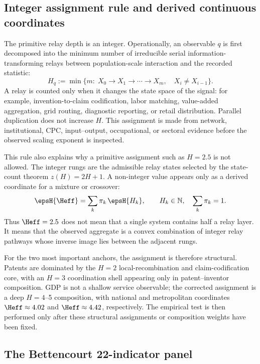 \subsection{Integer assignment rule and derived continuous coordinates}
\label{subsec:integer_assignment_rule}

The primitive relay depth is an integer. Operationally, an observable \(q\)
is first decomposed into the minimum number of irreducible serial
information-transforming relays between population-scale interaction and the
recorded statistic:
\[
H_q := \min\{m:\; X_0\rightarrow X_1\rightarrow\cdots\rightarrow X_m,
\quad X_i\neq X_{i-1}\}.
\]
A relay is counted only when it changes the state space of the signal:
for example, invention-to-claim codification, labor matching, value-added
aggregation, grid routing, diagnostic reporting, or retail distribution.
Parallel duplication does not increase \(H\). This assignment is made from
network, institutional, CPC, input--output, occupational, or sectoral evidence
before the observed scaling exponent is inspected.

This rule also explains why a primitive assignment such as \(H=2.5\) is not
allowed. The integer rungs are the admissible relay states selected by the
state-count theorem \(z(H)=2H+1\). A non-integer value appears only as a
derived coordinate for a mixture or crossover:
\[
\epsH{\Heff}=\sum_k \pi_k\,\epsH{H_k},
\qquad H_k\in\mathbb{N},\quad \sum_k\pi_k=1.
\]
Thus \(\Heff=2.5\) does not mean that a single system contains half a relay
layer. It means that the observed aggregate is a convex combination of
integer relay pathways whose inverse image lies between the adjacent rungs.

For the two most important anchors, the assignment is therefore structural.
Patents are dominated by the \(H=2\) local-recombination and claim-codification
core, with an \(H=3\) coordination shell appearing only in patent--inventor
composition. GDP is not a shallow service observable; the corrected assignment
is a deep \(H=4\)--5 composition, with national and metropolitan coordinates
\(\Heff\approx4.02\) and \(\Heff\approx4.42\), respectively. The empirical
test is then performed only after these structural assignments or composition
weights have been fixed.

\subsection{The Bettencourt 22-indicator panel}\label{subsec:waterfall_layers}


